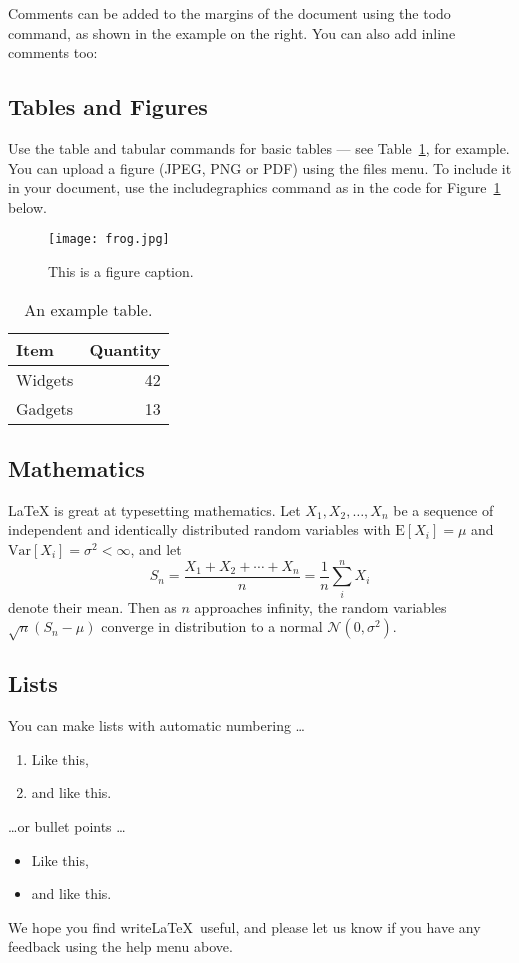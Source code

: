 Comments can be added to the margins of the document using the  todo command, as shown in the example on the right. You can also add inline comments too:


\subsection{Tables and Figures}

Use the table and tabular commands for basic tables --- see Table~\ref{tab:widgets}, for example. You can upload a figure (JPEG, PNG or PDF) using the files menu. To include it in your document, use the includegraphics command as in the code for Figure~\ref{fig:frog} below.

\begin{figure}
\centering
\texttt{[image: frog.jpg]}
\caption{\label{fig:frog}This is a figure caption.}
\end{figure}

\begin{table}
\centering
\begin{tabular}{l|r}
Item & Quantity \\\hline
Widgets & 42 \\
Gadgets & 13
\end{tabular}
\caption{\label{tab:widgets}An example table.}
\end{table}

\subsection{Mathematics}

\LaTeX{} is great at typesetting mathematics. Let $X_1, X_2, \ldots, X_n$ be a sequence of independent and identically distributed random variables with $\text{E}[X_i] = \mu$ and $\text{Var}[X_i] = \sigma^2 < \infty$, and let
$$S_n = \frac{X_1 + X_2 + \cdots + X_n}{n}
      = \frac{1}{n}\sum_{i}^{n} X_i$$
denote their mean. Then as $n$ approaches infinity, the random variables $\sqrt{n}(S_n - \mu)$ converge in distribution to a normal $\mathcal{N}(0, \sigma^2)$.

\subsection{Lists}

You can make lists with automatic numbering \dots

\begin{enumerate}
\item Like this,
\item and like this.
\end{enumerate}
\dots or bullet points \dots
\begin{itemize}
\item Like this,
\item and like this.
\end{itemize}

We hope you find write\LaTeX\ useful, and please let us know if you have any feedback using the help menu above.



